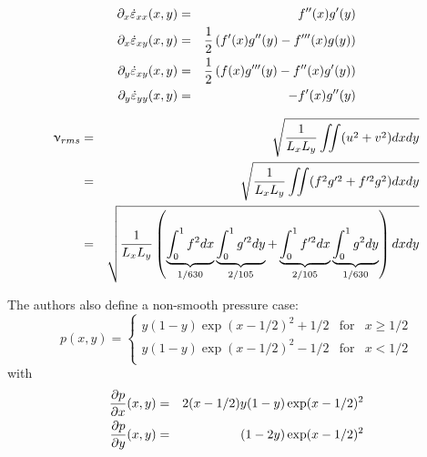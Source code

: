\begin{eqnarray}
\partial_x \dot\varepsilon_{xx} (x,y)&=&  f''(x)g'(y) \nonumber\\
\partial_x \dot\varepsilon_{xy} (x,y)&=& \frac12\left(f'(x)g''(y)-f'''(x)g(y)\right)\nonumber\\
\partial_y \dot\varepsilon_{xy} (x,y)&=& \frac12\left(f(x)g'''(y)-f''(x)g'(y) \right)\nonumber\\
\partial_y \dot\varepsilon_{yy} (x,y)&=& -f'(x)g''(y) \nonumber
\end{eqnarray}

\begin{eqnarray}
\upnu_{rms}
&=& \sqrt{ \frac{1}{L_xL_y} \iint (u^2+v^2) dxdy   } \nonumber\\
&=& \sqrt{ \frac{1}{L_xL_y} \iint (f^2g'^2+f'^2g^2) dxdy   } \nonumber\\
&=& \sqrt{ \frac{1}{L_xL_y} \left( 
\underbrace{\int_0^1 f^2 dx}_{1/630} 
\underbrace{\int_0^1 g'^2 dy}_{2/105}
+ 
\underbrace{\int_0^1 f'^2 dx }_{2/105}
\underbrace{\int_0^1g^2dy}_{1/630} \right) dxdy} 
\end{eqnarray}

The authors also define a non-smooth pressure case:
\[
p(x,y)=
\left\{
\begin{array}{lll}
y(1-y)\exp(x-1/2)^2+1/2 & \text{for}& x\ge 1/2 \\
y(1-y)\exp(x-1/2)^2-1/2 & \text{for}& x< 1/2 \\
\end{array}
\right.
\]
with 
\begin{eqnarray}
\frac{\partial p}{\partial x} (x,y)&=& 2(x-1/2)y(1-y)\exp(x-1/2)^2 \nonumber\\
\frac{\partial p}{\partial y} (x,y)&=& (1-2y) \exp(x-1/2)^2 \nonumber
\end{eqnarray}


